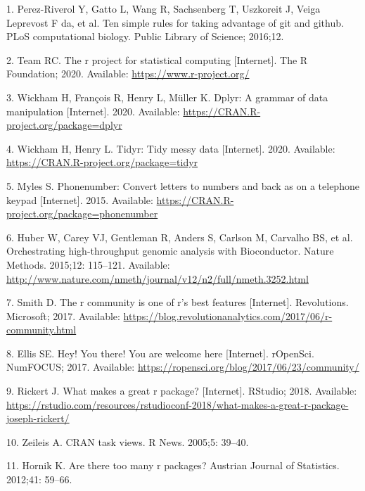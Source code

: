 \documentclass[10pt,letterpaper]{article}
\begin{document}
\hypertarget{refs}{}
\leavevmode\hypertarget{ref-perez2016}{}%
1. Perez-Riverol Y, Gatto L, Wang R, Sachsenberg T, Uszkoreit J, Veiga
Leprevost F da, et al. Ten simple rules for taking advantage of git and
github. PLoS computational biology. Public Library of Science; 2016;12.

\leavevmode\hypertarget{ref-Rproject2020}{}%
2. Team RC. The r project for statistical computing {[}Internet{]}. The
R Foundation; 2020. Available: \url{https://www.r-project.org/}

\leavevmode\hypertarget{ref-dplyr}{}%
3. Wickham H, François R, Henry L, Müller K. Dplyr: A grammar of data
manipulation {[}Internet{]}. 2020. Available:
\url{https://CRAN.R-project.org/package=dplyr}

\leavevmode\hypertarget{ref-tidyr}{}%
4. Wickham H, Henry L. Tidyr: Tidy messy data {[}Internet{]}. 2020.
Available: \url{https://CRAN.R-project.org/package=tidyr}

\leavevmode\hypertarget{ref-phonenumber}{}%
5. Myles S. Phonenumber: Convert letters to numbers and back as on a
telephone keypad {[}Internet{]}. 2015. Available:
\url{https://CRAN.R-project.org/package=phonenumber}

\leavevmode\hypertarget{ref-bioCproject}{}%
6. Huber W, Carey VJ, Gentleman R, Anders S, Carlson M, Carvalho BS, et
al. Orchestrating high-throughput genomic analysis with Bioconductor.
Nature Methods. 2015;12: 115--121. Available:
\url{http://www.nature.com/nmeth/journal/v12/n2/full/nmeth.3252.html}

\leavevmode\hypertarget{ref-smith2017}{}%
7. Smith D. The r community is one of r's best features {[}Internet{]}.
Revolutions. Microsoft; 2017. Available:
\url{https://blog.revolutionanalytics.com/2017/06/r-community.html}

\leavevmode\hypertarget{ref-ellis2017}{}%
8. Ellis SE. Hey! You there! You are welcome here {[}Internet{]}.
rOpenSci. NumFOCUS; 2017. Available:
\url{https://ropensci.org/blog/2017/06/23/community/}

\leavevmode\hypertarget{ref-rickert2018}{}%
9. Rickert J. What makes a great r package? {[}Internet{]}. RStudio;
2018. Available:
\url{https://rstudio.com/resources/rstudioconf-2018/what-makes-a-great-r-package-joseph-rickert/}

\leavevmode\hypertarget{ref-zeileis2005}{}%
10. Zeileis A. CRAN task views. R News. 2005;5: 39--40.

\leavevmode\hypertarget{ref-hornik2012}{}%
11. Hornik K. Are there too many r packages? Austrian Journal of
Statistics. 2012;41: 59--66.
\end{document}
